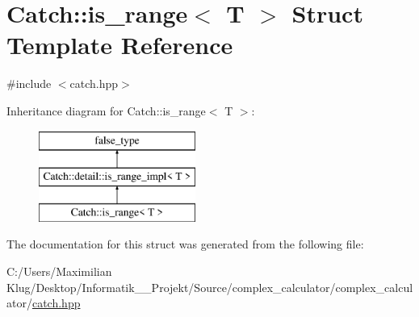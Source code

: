 \hypertarget{struct_catch_1_1is__range}{}\section{Catch\+:\+:is\+\_\+range$<$ T $>$ Struct Template Reference}
\label{struct_catch_1_1is__range}


{\ttfamily \#include $<$catch.\+hpp$>$}

Inheritance diagram for Catch\+:\+:is\+\_\+range$<$ T $>$\+:\begin{figure}[H]
\begin{center}
\leavevmode
\includegraphics[height=3.000000cm]{struct_catch_1_1is__range}
\end{center}
\end{figure}


The documentation for this struct was generated from the following file\+:\begin{DoxyCompactItemize}
\item 
C\+:/\+Users/\+Maximilian Klug/\+Desktop/\+Informatik\+\_\+\_\+\+Projekt/\+Source/complex\+\_\+calculator/complex\+\_\+calculator/\mbox{\hyperlink{catch_8hpp}{catch.\+hpp}}\end{DoxyCompactItemize}
